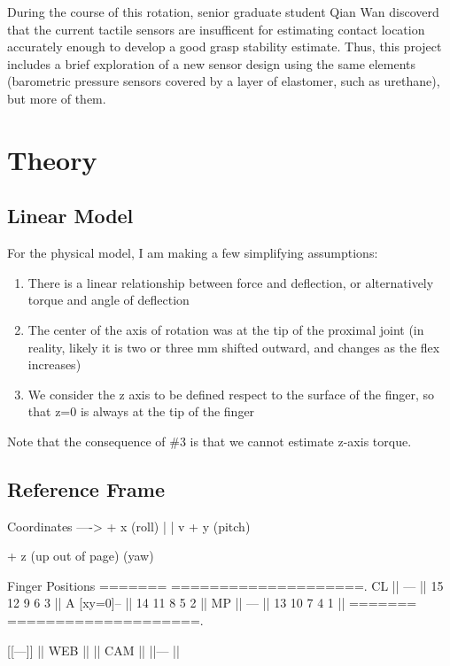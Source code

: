 \documentclass[preprint,12pt,3p]{elsarticle}
\begin{document}
During the course of this rotation, senior graduate student Qian Wan discoverd that the current tactile
sensors are insufficent for estimating contact location accurately enough to develop a good grasp
stability estimate. Thus, this project includes a brief exploration of a new sensor design using the
same elements (barometric pressure sensors covered by a layer of elastomer, such as urethane), but
more of them.

\section{Theory} \label{sec:firstpage}

\subsection{Linear Model}

For the physical model, I am making a few simplifying assumptions:
 
    \begin{enumerate}
        \item There is a linear relationship between force and deflection, or alternatively torque and angle of deflection
        \item The center of the axis of rotation was at the tip of the proximal joint
    (in reality, likely it is two or three mm shifted outward, and changes as the flex increases)
        \item We consider the z axis to be defined respect to the surface of the finger, so that z=0 is always
    at the tip of the finger
    \end{enumerate}

Note that the consequence of \#3 is that we cannot estimate z-axis torque.

\subsection{Reference Frame}

\begin{ttlisting}[language=C++,breaklines]
Coordinates
----> + x (roll)
|
|
v
+ y (pitch)

+ z (up out of page) (yaw)


Finger Positions
=======      ====================.
 {CL}  || --- || 15  12  9  6  3 ||
 {A} [xy=0]-- || 14  11  8  5  2 ||
 {MP}  || --- || 13  10  7  4  1 ||
=======      ====================.


  [[---]]
||  WEB  ||
||  CAM  ||
  ||--- ||
  
\end{ttlisting}
\end{document}
